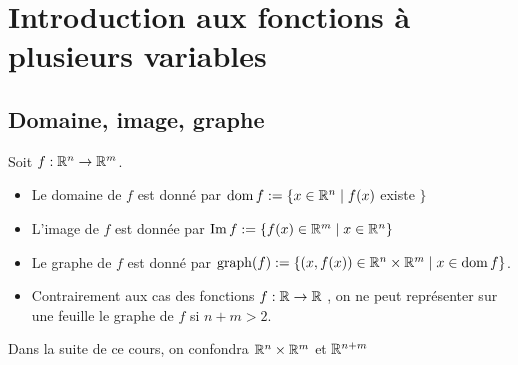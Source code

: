 \chapter{Introduction aux fonctions à plusieurs variables}
\section{Domaine, image, graphe}
Soit $f:\mathbb{R}^n\to\mathbb{R}^m$.
\begin{itemize}
    \item Le domaine de $f$ est donné par $\operatorname{dom} f := \{x\in\mathbb{R}^n\mid f(x) $ existe $\}$
    \item L'image de $f$ est donnée par $\operatorname{Im} f: = \{f(x)\in\mathbb{R}^m\mid x\in \mathbb{R}^n\}$
    \item Le graphe de $f$ est donné par $\operatorname{graph}(f):=\{(x,f(x))\in\mathbb{R}^n\times \mathbb{R}^m\mid x\in \operatorname{dom} f\}$.
    \item Contrairement aux cas des fonctions $f:\mathbb{R}\to\mathbb{R}$ , on ne peut représenter sur une feuille le graphe de $f$ si $n+m>2$.
\end{itemize}
\begin{remarque}
    Dans la suite de ce cours, on confondra $\mathbb{R}^n\times\mathbb{R}^m$ et $\mathbb{R}^{n+m}$
\end{remarque}
